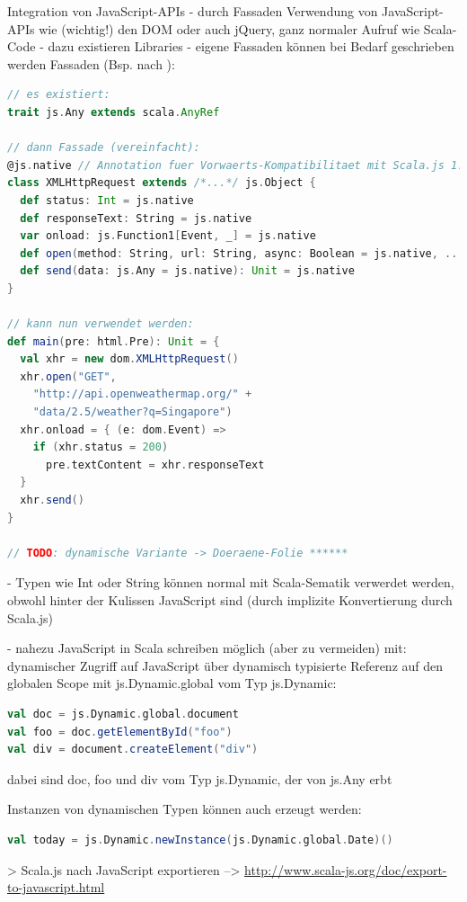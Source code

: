 \documentclass[a4paper, 12pt, hidelinks, listof=totoc, listoftables=totoc, bibliography=totoc]{scrreprt}
\begin{document}
Integration von JavaScript-APIs
- durch Fassaden Verwendung von JavaScript-APIs wie (wichtig!) den DOM oder auch jQuery, ganz normaler Aufruf wie Scala-Code
	- dazu existieren Libraries
	- eigene Fassaden können bei Bedarf geschrieben werden
		Fassaden (Bsp. nach \cite{doeraene2015.SSP}):

\begin{lstlisting}[language=Scala]
// es existiert:
trait js.Any extends scala.AnyRef

// dann Fassade (vereinfacht):
@js.native // Annotation fuer Vorwaerts-Kompatibilitaet mit Scala.js 1.0.0
class XMLHttpRequest extends /*...*/ js.Object {
  def status: Int = js.native
  def responseText: String = js.native
  var onload: js.Function1[Event, _] = js.native
  def open(method: String, url: String, async: Boolean = js.native, ...): Unit = js.native
  def send(data: js.Any = js.native): Unit = js.native
}

// kann nun verwendet werden:
def main(pre: html.Pre): Unit = {
  val xhr = new dom.XMLHttpRequest()
  xhr.open("GET",
    "http://api.openweathermap.org/" +
    "data/2.5/weather?q=Singapore")
  xhr.onload = { (e: dom.Event) =>
    if (xhr.status = 200)
      pre.textContent = xhr.responseText
  }
  xhr.send()
}

// TODO: dynamische Variante -> Doeraene-Folie ******
\end{lstlisting}
- Typen wie Int oder String können normal mit Scala-Sematik verwerdet werden, obwohl hinter der Kulissen JavaScript sind (durch implizite Konvertierung durch Scala.js)



- nahezu JavaScript in Scala schreiben möglich (aber zu vermeiden) mit: dynamischer Zugriff auf JavaScript über dynamisch typisierte Referenz auf den globalen Scope mit js.Dynamic.global vom Typ js.Dynamic:
\begin{lstlisting}[language=Scala]
val doc = js.Dynamic.global.document
val foo = doc.getElementById("foo")
val div = document.createElement("div")
\end{lstlisting}
dabei sind doc, foo und div vom Typ js.Dynamic, der von js.Any erbt

Instanzen von dynamischen Typen können auch erzeugt werden:
\begin{lstlisting}[language=Scala]
val today = js.Dynamic.newInstance(js.Dynamic.global.Date)()
\end{lstlisting}



> Scala.js nach JavaScript exportieren
	-->  \url{http://www.scala-js.org/doc/export-to-javascript.html}
\end{document}
